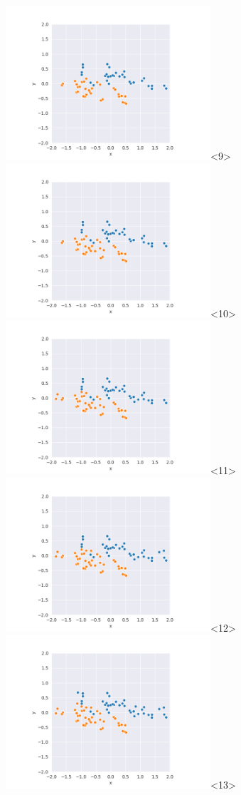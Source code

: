 \begin{frame}
  \includegraphics[width=3in]{../png/single_stretch/single_stretch_41.png}<9>
  \includegraphics[width=3in]{../png/single_stretch/single_stretch_46.png}<10>
  \includegraphics[width=3in]{../png/single_stretch/single_stretch_51.png}<11>
  \includegraphics[width=3in]{../png/single_stretch/single_stretch_56.png}<12>
  \includegraphics[width=3in]{../png/single_stretch/single_stretch_61.png}<13>

\end{frame}
